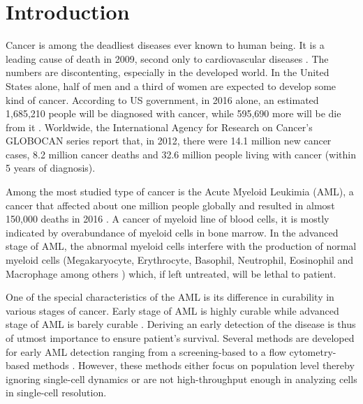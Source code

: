 \documentclass[pdftex,12pt,a4paper]{report}
\begin{document}
\tableofcontents

\newpage

\listoffigures

\newpage

\listoftables

\newpage

\chapter{Introduction}
\label{chapter:introduction}



Cancer is among the deadliest diseases ever known to human being. It is a leading cause of death in 2009, second only to cardiovascular diseases \cite{sudhakar2009history}. The numbers are discontenting, especially in the developed world. In the United States alone, half of men and a third of women are expected to develop some kind of cancer. According to US government, in 2016 alone, an estimated 1,685,210 people will be diagnosed with cancer, while 595,690 more will be die from it \cite{cancergov2017stat}. Worldwide, the International Agency for Research on Cancer's GLOBOCAN series report that, in 2012, \cite{ferlay2015cancer} there were 14.1 million new cancer cases, 8.2 million cancer deaths and 32.6 million people living with cancer (within 5 years of diagnosis).

Among the most studied type of cancer is the Acute Myeloid Leukimia (AML), a cancer that affected about one million people globally and resulted in almost 150,000 deaths in 2016 \cite{vos2016global}. A cancer of myeloid line of blood cells, it is mostly indicated by overabundance of myeloid cells in bone marrow. In the advanced stage of AML, the abnormal myeloid cells interfere with the production of normal myeloid cells \cite{nci2018aml} (Megakaryocyte, Erythrocyte, Basophil, Neutrophil, Eosinophil and Macrophage among others \cite{collins1977continuous}) which, if left untreated, will be lethal to patient.

One of the special characteristics of the AML is its difference in curability in various stages of cancer. Early stage of AML is highly curable while advanced stage of AML is barely curable \cite{greaves1993stem}. Deriving an early detection of the disease is thus of utmost importance to ensure patient's survival. Several methods are developed for early AML detection ranging from a screening-based \cite{cowen1973aml} to a flow cytometry-based methods \cite{terwijn2013high}. However, these methods either focus on population level thereby ignoring single-cell dynamics or are not high-throughput enough in analyzing cells in single-cell resolution.
\end{document}
